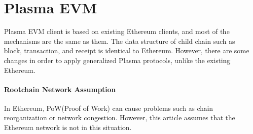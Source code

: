 \documentclass[letterpaper, 11pt]{article}
\begin{document}
\section{Plasma EVM} \label{sec:childchain}
\begin{CJK}{UTF8}{mj}
Plasma EVM client is based on existing Ethereum clients, and most of the mechanisms are the same as them. The data structure of child chain such as block, transaction, and receipt is identical to Ethereum. However, there are some changes in order to apply generalized Plasma protocols, unlike the existing Ethereum.
\end{CJK}

\paragraph{Rootchain Network Assumption} \begin{CJK}{UTF8}{mj}
In Ethereum, PoW(Proof of Work) can cause problems such as chain reorganization or network congestion. However, this article assumes that the Ethereum network is not in this situation.
\end{CJK}
\end{document}
